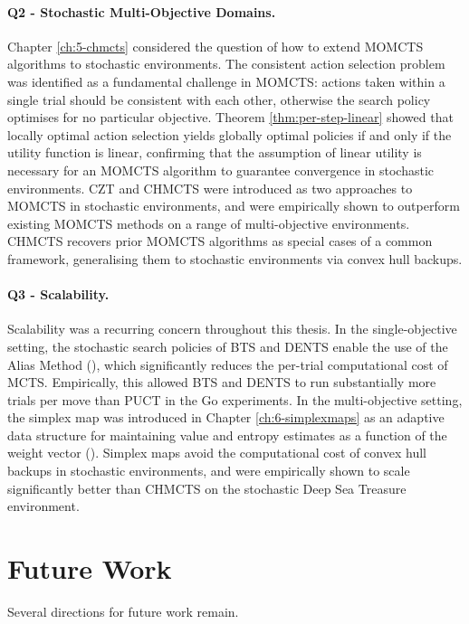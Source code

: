     \paragraph{Q2 - Stochastic Multi-Objective Domains.}
    Chapter \ref{ch:5-chmcts} considered the question of how to extend MOMCTS algorithms to stochastic environments. The consistent action selection problem was identified as a fundamental challenge in MOMCTS: actions taken within a single trial should be consistent with each other, otherwise the search policy optimises for no particular objective. Theorem \ref{thm:per-step-linear} showed that locally optimal action selection yields globally optimal policies if and only if the utility function is linear, confirming that the assumption of linear utility is necessary for an MOMCTS algorithm to guarantee convergence in stochastic environments. CZT and CHMCTS were introduced as two approaches to MOMCTS in stochastic environments, and were empirically shown to outperform existing MOMCTS methods on a range of multi-objective environments. CHMCTS recovers prior MOMCTS algorithms as special cases of a common framework, generalising them to stochastic environments via convex hull backups.

    \paragraph{Q3 - Scalability.}
    Scalability was a recurring concern throughout this thesis. In the single-objective setting, the stochastic search policies of BTS and DENTS enable the use of the Alias Method (\complexityq), which significantly reduces the per-trial computational cost of MCTS. Empirically, this allowed BTS and DENTS to run substantially more trials per move than PUCT in the Go experiments. In the multi-objective setting, the simplex map was introduced in Chapter \ref{ch:6-simplexmaps} as an adaptive data structure for maintaining value and entropy estimates as a function of the weight vector (\moscalabilityq). Simplex maps avoid the computational cost of convex hull backups in stochastic environments, and were empirically shown to scale significantly better than CHMCTS on the stochastic Deep Sea Treasure environment.



\section{Future Work}
\label{sec:7-2-futurework}

    Several directions for future work remain. 

